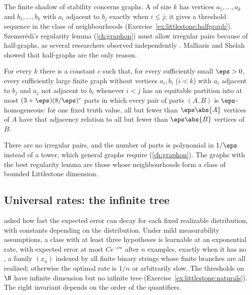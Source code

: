 \begin{refsection}
The finite shadow of stability concerns graphs. A  of size $k$ has vertices $a_1,\dots,a_k$ and $b_1,\dots,b_k$ with $a_i$ adjacent to $b_j$ exactly when $i\le j$; it gives a threshold sequence in the class of neighbourhoods (Exercise~\ref{ex:littlestone:halfgraph}). Szemerédi's regularity lemma (\cref{ch:graphon}) must allow irregular pairs because of half-graphs, as several researchers observed independently \parencite{MalliarisShelah2014}. Malliaris and Shelah showed that half-graphs are the only reason.

\begin{theorem}\label{thm:littlestone:stable-reg}
For every $k$ there is a constant $c$ such that, for every sufficiently small $\eps>0$, every sufficiently large finite graph without vertices $a_i,b_i$ ($i<k$) with $a_i$ adjacent to $b_j$ and $a_j$ not adjacent to $b_i$ whenever $i<j$ has an equitable partition into at most $(3+\eps)(8/\eps)^{c}$ parts in which every pair of parts $(A,B)$ is $\eps$-homogeneous: for one fixed truth value, all but fewer than $\eps\abs{A}$ vertices of $A$ have that adjacency relation to all but fewer than $\eps\abs{B}$ vertices of $B$.
\end{theorem}

There are no irregular pairs, and the number of parts is polynomial in $1/\eps$ instead of a tower, which general graphs require (\cref{ch:graphon}). The graphs with the best regularity lemma are those whose neighbourhoods form a class of bounded Littlestone dimension.

\subsection{Universal rates: the infinite tree}\label{sec:littlestone:universal}

\Textcite{BousquetHannekeMoranVanHandelYehudayoff2021} asked how fast the expected error can decay for each fixed realizable distribution, with constants depending on the distribution. Under mild measurability assumptions, a class with at least three hypotheses is learnable at an exponential rate, with expected error at most $Ce^{-cn}$ after $n$ examples, exactly when it has no , a family $(x_u)$ indexed by all finite binary strings whose finite branches are all realized; otherwise the optimal rate is $1/n$ or arbitrarily slow. The thresholds on $\N$ have infinite dimension but no infinite tree (Exercise~\ref{ex:littlestone:naturals}). The right invariant depends on the order of the quantifiers.


\end{refsection}
